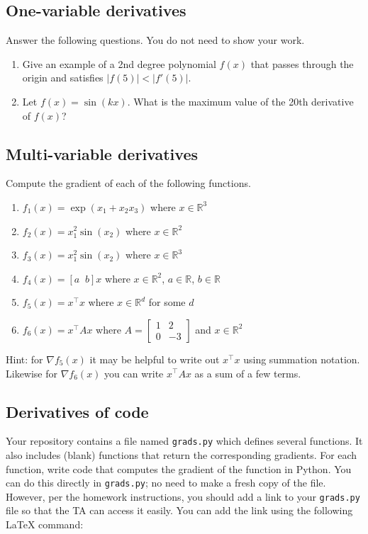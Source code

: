 \documentclass{article}
\def\blu#1{{\color{blu}#1}}
\begin{document}
\subsection{One-variable derivatives}

\blu{Answer the following questions.} You do not need to show your work.

\begin{enumerate}
\item Give an example of a 2nd degree polynomial $f(x)$ that passes through the origin and
satisfies ${|f(5)|<|f'(5)|}$.
\item Let $f(x)=\sin(kx)$. What is the maximum value of the 20th derivative of $f(x)$? 
\end{enumerate}

\subsection{Multi-variable derivatives}

\blu{Compute the gradient of each of the following functions.}
\begin{enumerate}
\item $f_1(x) = \exp(x_1 + x_2x_3)$ where $x \in \mathbb{R}^3$
\item $f_2(x) = x_1^2\sin(x_2)$ where $x \in \mathbb{R}^2$
\item $f_3(x) = x_1^2\sin(x_2)$ where $x \in \mathbb{R}^3$
\item $f_4(x) = [a\;\; b]x$ where $x \in \mathbb{R}^2$, $a \in \mathbb{R}$, $b \in \mathbb{R}$
\item $f_5(x) = x^\top x$ where $x \in \mathbb{R}^d$ for some $d$
\item $f_6(x) = x^\top A x$ where $A=\left[ \begin{array}{cc}
1 & 2 \\
0 & -3 \end{array} \right]$ and $x \in \mathbb{R}^2$
\end{enumerate}

Hint: for $\nabla f_5(x)$ it may be helpful to write out $x^\top x$ using summation notation. Likewise for $\nabla f_6(x)$ you can write $x^\top A x$ as a sum of a few terms. 

\subsection{Derivatives of code}

Your repository contains a file named \texttt{grads.py} which defines several functions.
It also includes (blank) functions that return the corresponding gradients.
For each function, \blu{write code that computes the gradient of the function} in Python.
You can do this directly in \texttt{grads.py}; no need to make a fresh copy of the file. However, per the homework instructions, you should add a link to your \texttt{grads.py} file so that the TA can access it easily. You can add the link using the following LaTeX command:
\end{document}

